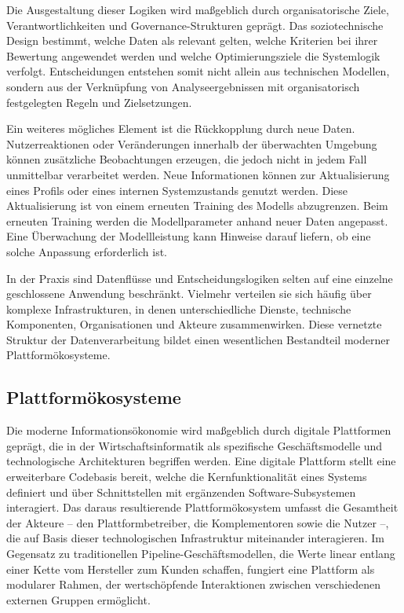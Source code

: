 Die Ausgestaltung dieser Logiken wird maßgeblich durch organisatorische Ziele, Verantwortlichkeiten und Governance-Strukturen geprägt. Das soziotechnische Design bestimmt, welche Daten als relevant gelten, welche Kriterien bei ihrer Bewertung angewendet werden und welche Optimierungsziele die Systemlogik verfolgt. Entscheidungen entstehen somit nicht allein aus technischen Modellen, sondern aus der Verknüpfung von Analyseergebnissen mit organisatorisch festgelegten Regeln und Zielsetzungen.

Ein weiteres mögliches Element ist die Rückkopplung durch neue Daten. Nutzerreaktionen oder Veränderungen innerhalb der überwachten Umgebung können zusätzliche Beobachtungen erzeugen, die jedoch nicht in jedem Fall unmittelbar verarbeitet werden. Neue Informationen können zur Aktualisierung eines Profils oder eines internen Systemzustands genutzt werden. Diese Aktualisierung ist von einem erneuten Training des Modells abzugrenzen. Beim erneuten Training werden die Modellparameter anhand neuer Daten angepasst. Eine Überwachung der Modellleistung kann Hinweise darauf liefern, ob eine solche Anpassung erforderlich ist.

In der Praxis sind Datenflüsse und Entscheidungslogiken selten auf eine einzelne geschlossene Anwendung beschränkt. Vielmehr verteilen sie sich häufig über komplexe Infrastrukturen, in denen unterschiedliche Dienste, technische Komponenten, Organisationen und Akteure zusammenwirken. Diese vernetzte Struktur der Datenverarbeitung bildet einen wesentlichen Bestandteil moderner Plattformökosysteme.

\subsection{Plattformökosysteme}

Die moderne Informationsökonomie wird maßgeblich durch digitale Plattformen geprägt, die in der Wirtschaftsinformatik als spezifische Geschäftsmodelle und technologische Architekturen begriffen werden. Eine digitale Plattform stellt eine erweiterbare Codebasis bereit, welche die Kernfunktionalität eines Systems definiert und über Schnittstellen mit ergänzenden Software-Subsystemen interagiert. Das daraus resultierende Plattformökosystem umfasst die Gesamtheit der Akteure -- den Plattformbetreiber, die Komplementoren sowie die Nutzer --, die auf Basis dieser technologischen Infrastruktur miteinander interagieren. Im Gegensatz zu traditionellen Pipeline-Geschäftsmodellen, die Werte linear entlang einer Kette vom Hersteller zum Kunden schaffen, fungiert eine Plattform als modularer Rahmen, der wertschöpfende Interaktionen zwischen verschiedenen externen Gruppen ermöglicht.

